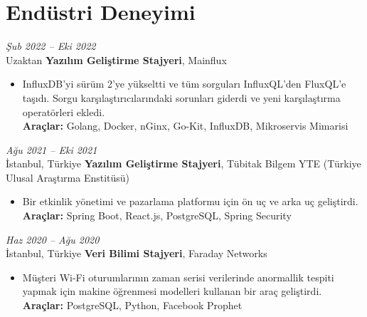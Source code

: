 \section{Endüstri Deneyimi}

\begin{twocolentry}{
    \textit{Şub 2022 – Eki 2022}\\
    \small Uzaktan}
    \normalsize \textbf{Yazılım Geliştirme Stajyeri}, \small {Mainflux}
    \small  
    \begin{itemize}
        \item InfluxDB'yi sürüm 2'ye yükseltti ve tüm sorguları InfluxQL'den FluxQL'e taşıdı. Sorgu karşılaştırıcılarındaki sorunları giderdi ve yeni karşılaştırma operatörleri ekledi.\\
        \footnotesize \textbf{Araçlar:} Golang, Docker, nGinx, Go-Kit, InfluxDB, Mikroservis Mimarisi
    \end{itemize}
\end{twocolentry}

\vspace{\betweenentryspace}

\begin{twocolentry}{
    \textit{Ağu 2021 – Eki 2021}\\
    \small İstanbul, Türkiye}
    \normalsize \textbf{Yazılım Geliştirme Stajyeri}, \small {Tübitak Bilgem YTE (Türkiye Ulusal Araştırma Enstitüsü)}
    \small  
    \begin{itemize}
        \item Bir etkinlik yönetimi ve pazarlama platformu için ön uç ve arka uç geliştirdi.\\
        \footnotesize \textbf{Araçlar:} Spring Boot, React.js, PostgreSQL, Spring Security
    \end{itemize}
    
\end{twocolentry}

\vspace{\betweenentryspace}

\begin{twocolentry}{
    \textit{Haz 2020 – Ağu 2020}\\
    \small İstanbul, Türkiye}
    \normalsize \textbf{Veri Bilimi Stajyeri}, \small {Faraday Networks}
    \small  
    \begin{itemize}
        \item Müşteri Wi-Fi oturumlarının zaman serisi verilerinde anormallik tespiti yapmak için makine öğrenmesi modelleri kullanan bir araç geliştirdi.\\
        \footnotesize \textbf{Araçlar:} PostgreSQL, Python, Facebook Prophet
    \end{itemize}
    
\end{twocolentry}
